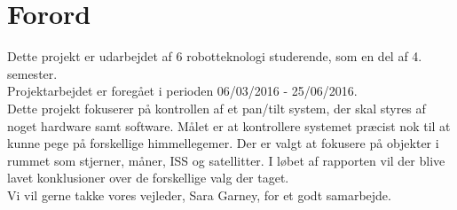 \section*{Forord}

Dette projekt er udarbejdet af 6 robotteknologi studerende, som en del af 4. semester.\\ Projektarbejdet er foregået i perioden 06/03/2016 - 25/06/2016. 
\\
Dette projekt fokuserer på kontrollen af et pan/tilt system, der skal styres af noget hardware samt software. Målet er at kontrollere systemet præcist nok til at kunne pege på forskellige himmellegemer. Der er valgt at fokusere på objekter i rummet som stjerner, måner, ISS og satellitter. I løbet af rapporten vil der blive lavet konklusioner over de forskellige valg der taget.
\\
Vi vil gerne takke vores vejleder, Sara Garney, for et godt samarbejde.